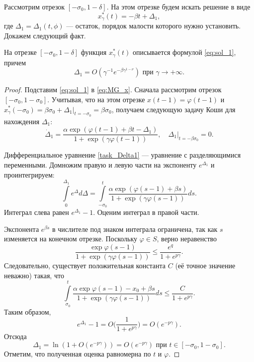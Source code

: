 Рассмотрим отрезок $[-\sigma_0, 1 - \delta]$. На этом отрезке будем искать решение в виде
%
\begin{equation}
	\label{eq:sol_1}
	x_\gamma^*(t) = -\beta t + \Delta_1,
\end{equation}
%
где $\Delta_1 = \Delta_1(t, \phi)$ --- остаток, порядок малости которого нужно установить. Докажем следующий факт.
%
\begin{lemma}
\label{lm:Delta1}
На отрезке $[-\sigma_0, 1 - \delta]$ функция $x_\gamma^*(t)$ описывается формулой \eqref{eq:sol_1}, причем
%
\[
\Delta_1 = O\left(\gamma^{-1} e^{-\beta\gamma^{1 - \nu}}\right) \text{ при } \gamma \to +\infty.
\]
\end{lemma}
\begin{proof}
Подставим \eqref{eq:sol_1} в \eqref{eq:MG_x}. Сначала рассмотрим отрезок $[-\sigma_0, 1 - \sigma_0]$. Учитывая, что на этом отрезке $x(t - 1) = \varphi(t - 1)$ и $x_\gamma^*(-\sigma_0) = \beta \sigma_0 +\Delta_1|_{t = -\sigma_0} = \beta \sigma_0$, получаем следующую задачу Коши для нахождения $\Delta_1$: 
\begin{equation}
	\label{task_Delta1}
	\dot{\Delta}_1=\frac{\alpha \exp(\varphi(t-1) + \beta t - \Delta_1)}{1 + \exp(\gamma\varphi(t-1))},\quad \Delta_1|_{t = -\beta \sigma_0}=0.
\end{equation}

Дифференциальное уравнение \eqref{task_Delta1} --- уравнение с разделяющимися переменными. Домножим правую и левую части на экспоненту $e^{\Delta_1}$ и проинтегрируем:
%
\[
\int\limits_0^{\Delta_1} e^\Delta d\Delta=\int\limits_{-\sigma_0}^t \frac{\alpha \exp(\varphi(s-1) + \beta s)}{1 + \exp(\gamma\varphi(s - 1))}ds.
\]
%
Интеграл слева равен $e^{\Delta_1} - 1$. Оценим интеграл в правой части.

Экспонента $e^{\beta s}$ в числителе под знаком интеграла ограничена, так как $s$ изменяется на конечном отрезке. Поскольку $\varphi\in S$, верно неравенство
%
\[
\frac{\exp\varphi(s - 1)}{1 + \exp(\gamma\varphi(s - 1))} \leqslant \frac{e^q}{1 + e^{p \gamma}}.
\]
Следовательно, существует положительная константа $C$ (её точное значение неважно) такая, что
\[
\int\limits_{\sigma_0}^t\frac{\alpha\exp\varphi(s-1)-x_0+\beta s}{1+\exp(\gamma\varphi(s-1))}ds\leqslant\frac{C}{1+e^{p \gamma}}.
\]
%
Таким образом, 
\[
e^{\Delta_1}-1=O\Big(\frac{1}{1+e^{p \gamma}}\Big)=O(e^{-p \gamma}).
\]
Отсюда 
\[
\Delta_1=\ln(1+O(e^{-p \gamma}))=O(e^{-p \gamma}) \text{ при }t\in[-\sigma_0, 1 - \sigma_0].
\]
Отметим, что полученная оценка равномерна по $t$ и $\varphi$.


\end{proof}
